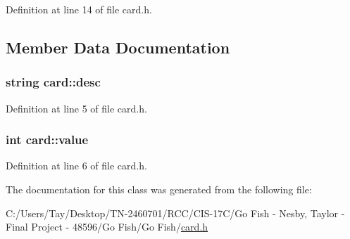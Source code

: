 Definition at line 14 of file card.\+h.



\subsection{Member Data Documentation}
\hypertarget{classcard_a19812a4daafbfa06456a048352ea7810}{
\subsubsection[{desc}]{\setlength{\rightskip}{0pt plus 5cm}string card\+::desc}}\label{classcard_a19812a4daafbfa06456a048352ea7810}


Definition at line 5 of file card.\+h.

\hypertarget{classcard_a8c8ecc859e715ee6b55bef5d692f508b}{
\subsubsection[{value}]{\setlength{\rightskip}{0pt plus 5cm}int card\+::value}}\label{classcard_a8c8ecc859e715ee6b55bef5d692f508b}


Definition at line 6 of file card.\+h.



The documentation for this class was generated from the following file\+:\begin{DoxyCompactItemize}
\item 
C\+:/\+Users/\+Tay/\+Desktop/\+T\+N-\/2460701/\+R\+C\+C/\+C\+I\+S-\/17\+C/\+Go Fish -\/ Nesby, Taylor -\/ Final Project -\/ 48596/\+Go Fish/\+Go Fish/\hyperlink{card_8h}{card.\+h}\end{DoxyCompactItemize}
